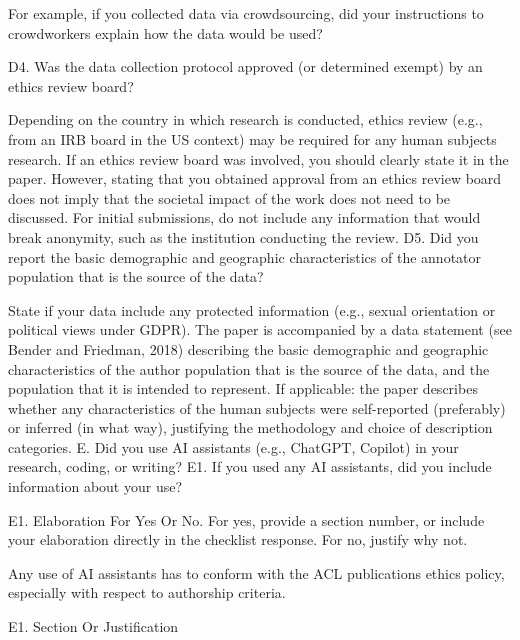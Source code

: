 For example, if you collected data via crowdsourcing, did your instructions to crowdworkers explain how the data would be used?

D4. Was the data collection protocol approved (or determined exempt) by an ethics review board?

Depending on the country in which research is conducted, ethics review (e.g., from an IRB board in the US context) may be required for any human subjects research. If an ethics review board was involved, you should clearly state it in the paper. However, stating that you obtained approval from an ethics review board does not imply that the societal impact of the work does not need to be discussed.
For initial submissions, do not include any information that would break anonymity, such as the institution conducting the review.
D5. Did you report the basic demographic and geographic characteristics of the annotator population that is the source of the data?

State if your data include any protected information (e.g., sexual orientation or political views under GDPR).
The paper is accompanied by a data statement (see Bender and Friedman, 2018) describing the basic demographic and geographic characteristics of the author population that is the source of the data, and the population that it is intended to represent.
If applicable: the paper describes whether any characteristics of the human subjects were self-reported (preferably) or inferred (in what way), justifying the methodology and choice of description categories.
E. Did you use AI assistants (e.g., ChatGPT, Copilot) in your research, coding, or writing?
E1. If you used any AI assistants, did you include information about your use?

E1. Elaboration For Yes Or No. For yes, provide a section number, or include your elaboration directly in the checklist response. For no, justify why not.

Any use of AI assistants has to conform with the ACL publications ethics policy, especially with respect to authorship criteria.

E1. Section Or Justification
